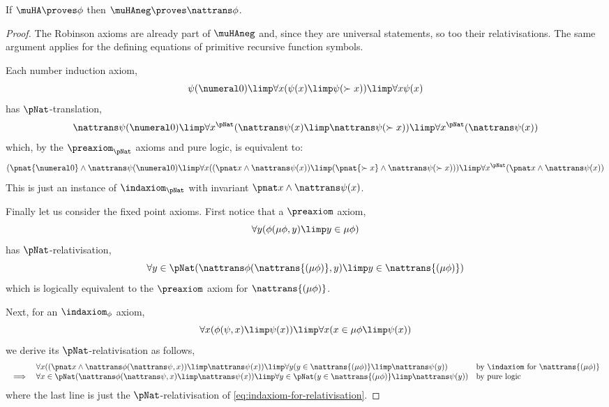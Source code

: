 \begin{proposition}
\label{prop:muHA-to-muHAneg}
    If $\muHA \proves \phi$ then $\muHAneg \proves \nattrans \phi$.
\end{proposition}
\begin{proof}
    The Robinson axioms are already part of $\muHAneg$ and, since they are universal statements, so too their relativisations.
    The same argument applies for the defining equations of primitive recursive function symbols.
    
    Each number induction axiom,
    \begin{equation}
        \label{eq:n-ind-instance-for-relativisation}
        \psi(\numeral 0) \limp \forall x (\psi(x) \limp \psi(\succ x)) \limp \forall x \psi(x)
    \end{equation}
    has $\pNat$-translation,
    \[
    \nattrans\psi(\numeral 0)
    \limp 
    \forall x^\pNat (\nattrans\psi(x) \limp \nattrans\psi(\succ x))
    \limp 
    \forall x^\pNat (\nattrans\psi(x))
    \]
    which, by the $\preaxiom_\pNat$ axioms and pure logic, is equivalent to:
    \[
    (\pnat {\numeral 0} \land \nattrans\psi(\numeral 0)
    \limp
    \forall x ((\pnat x \land \nattrans\psi(x)) \limp (\pnat{\succ x } \land \nattrans \psi(\succ x)))
    \limp
    \forall x^\pNat (\pnat x \land \nattrans \psi(x))
    \]
    This is just an instance of $\indaxiom_\pNat$ with invariant $\pnat x \land \nattrans \psi(x)$.

    
    Finally let us consider the fixed point axioms.
    First notice that a $\preaxiom$ axiom,
    \[
    \forall y (\phi(\mu \phi,y) \limp y \in \mu \phi)
    \]
    has $\pNat$-relativisation,
    \[
    \forall y \in \pNat ( \nattrans \phi (\nattrans{(\mu\phi)},y) \limp y \in \nattrans{(\mu\phi)})
    \]
    which is logically equivalent to the $\preaxiom$ axiom for $\nattrans {(\mu\phi)}$.
    
    Next, for an $\indaxiom_\phi$ axiom,
    \begin{equation}
    \label{eq:indaxiom-for-relativisation}
        \forall x (\phi(\psi,x) \limp \psi(x)) \limp \forall x (x \in \mu\phi \limp \psi(x))
    \end{equation}
    we derive its $\pNat$-relativisation as follows,
    \[
    \begin{array}{rll}
         &\forall x ((\pnat x \land \nattrans \phi (\nattrans \psi,x) ) \limp \nattrans \psi(x)) \limp \forall y (y \in \nattrans{(\mu\phi)} \limp \nattrans \psi (y)) & \text{by $\indaxiom$ for $\nattrans{(\mu\phi)}$}   \\
         \implies & \forall x \in \pNat ( \nattrans \phi (\nattrans \psi,x)  \limp \nattrans \psi(x)) \limp \forall y \in \pNat (y \in \nattrans{(\mu\phi)} \limp \nattrans \psi (y)) & \text{by pure logic}
    \end{array}
    \]
    where the last line is just the $\pNat$-relativisation of \eqref{eq:indaxiom-for-relativisation}.
\end{proof}


